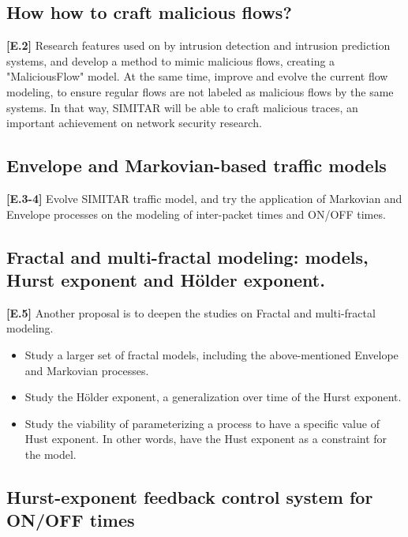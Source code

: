\subsection{How how to craft malicious flows?}

\textbf{[E.2]} Research features used on by intrusion detection and intrusion prediction systems, and develop a method to mimic malicious flows, creating a "MaliciousFlow" model. At the same time, improve and evolve the current flow modeling, to ensure regular flows are not labeled as malicious flows by the same systems.  In that way, SIMITAR will be able to craft malicious traces, an important achievement on network security research.

\subsection{Envelope and Markovian-based traffic models}

\textbf{[E.3-4]} Evolve SIMITAR traffic model, and try the application of  Markovian and Envelope processes on the modeling of inter-packet times and ON/OFF times.
 
\subsection{ Fractal and multi-fractal modeling: models, Hurst exponent and  Hölder exponent.}

\textbf{[E.5]} Another proposal is to deepen the studies on Fractal and multi-fractal modeling. 

\begin{itemize}
\item Study a larger set of fractal models, including the above-mentioned Envelope and Markovian processes.  
\item Study the Hölder exponent\cite{holder-exponent}, a generalization over time of the Hurst exponent. 
\item Study the viability of parameterizing a process to have a specific value of Hust exponent. In other words, have the Hust exponent as a constraint for the model.
\end{itemize}

\subsection{Hurst-exponent feedback control system for ON/OFF times}


